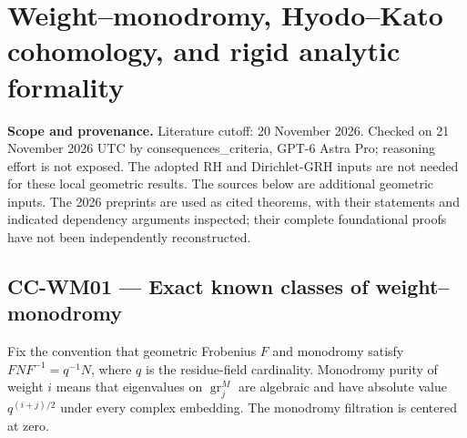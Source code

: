 \section{Weight--monodromy, Hyodo--Kato cohomology, and rigid analytic
formality}\label{weightmonodromy-hyodokato-cohomology-and-rigid-analytic-formality}

\textbf{Scope and provenance.} Literature cutoff: 20 November 2026.
Checked on 21 November 2026 UTC by consequences\_criteria, GPT-6 Astra
Pro; reasoning effort is not exposed. The adopted RH and Dirichlet-GRH
inputs are not needed for these local geometric results. The sources
below are additional geometric inputs. The 2026 preprints are used as
cited theorems, with their statements and indicated dependency arguments
inspected; their complete foundational proofs have not been
independently reconstructed.

\subsection{CC-WM01 --- Exact known classes of
weight--monodromy}\label{cc-wm01-exact-known-classes-of-weightmonodromy}

Fix the convention that geometric Frobenius \(F\) and monodromy satisfy
\(FNF^{-1}=q^{-1}N\), where \(q\) is the residue-field cardinality.
Monodromy purity of weight \(i\) means that eigenvalues on
\(\operatorname{gr}^M_j\) are algebraic and have absolute value
\(q^{(i+j)/2}\) under every complex embedding. The monodromy filtration
is centered at zero.

